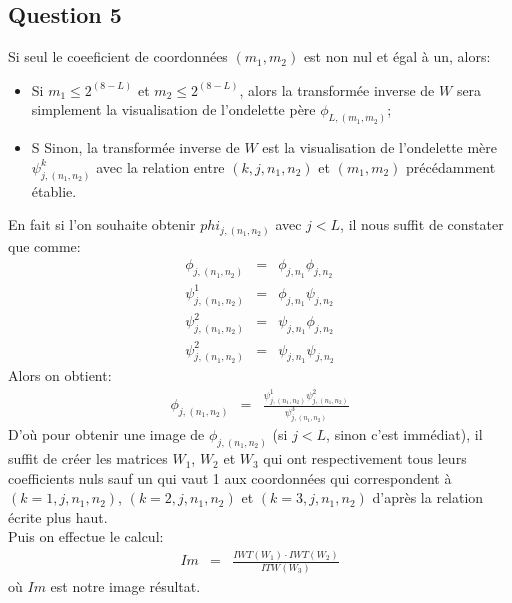 \documentclass{report}
\begin{document}
\subsection*{Question 5}
Si seul le coeeficient de coordonnées $(m_1, m_2)$ est non nul et égal à un, alors:
\begin{itemize}
	\item
	Si $m_1 \leq 2^{(8-L)}$ et $m_2\leq 2^{(8-L)}$, alors la transformée inverse de $W$ sera simplement la visualisation de l'ondelette père $\phi_{L, (m_1, m_2)}$;
	\item S
	Sinon, la transformée inverse de $W$ est la visualisation de l'ondelette mère $\psi^k_{j, (n_1, n_2)}$  avec la relation entre $(k, j, n_1, n_2)$ et $(m_1, m_2)$ précédamment établie.\\
\end{itemize}
En fait si l'on souhaite obtenir $phi_{j, (n_1, n_2)}$ avec $j<L$, il nous suffit de constater que comme:
\begin{eqnarray*}
\phi_{j, (n_1, n_2)} &=& \phi_{j, n_1}\phi_{j, n_2}\\
\psi^1_{j, (n_1, n_2)} &=& \phi_{j, n_1}\psi_{j, n_2}\\
\psi^2_{j, (n_1, n_2)} &=& \psi_{j, n_1}\phi_{j, n_2}\\
\psi^2_{j,(n_1, n_2)} &=& \psi_{j, n_1}\psi_{j, n_2}
\end{eqnarray*}
Alors on obtient:
\begin{eqnarray*}
\phi_{j, (n_1, n_2)} &=& \frac{\psi^1_{j, (n_1, n_2)}\psi^2_{j, (n_1, n_2)}}{\psi^3_{j, (n_1, n_2)}}
\end{eqnarray*} 
D'où pour obtenir une image de $\phi_{j, (n_1, n_2)}$ (si $j<L$, sinon c'est immédiat), il suffit de créer les matrices $W_1$, $W_2$ et $W_3$ qui ont respectivement tous leurs coefficients nuls sauf un qui vaut 1 aux coordonnées qui correspondent  à $(k=1, j, n_1, n_2)$, $(k=2, j, n_1, n_2)$ et $(k=3, j, n_1, n_2)$ d'après la relation écrite plus haut.\\
Puis on effectue le calcul:
\begin{eqnarray*}
Im &=& \frac{IWT(W_1)\cdot IWT(W_2)}{ITW(W_3)}
\end{eqnarray*}
où $Im$ est notre image résultat.
\end{document}
